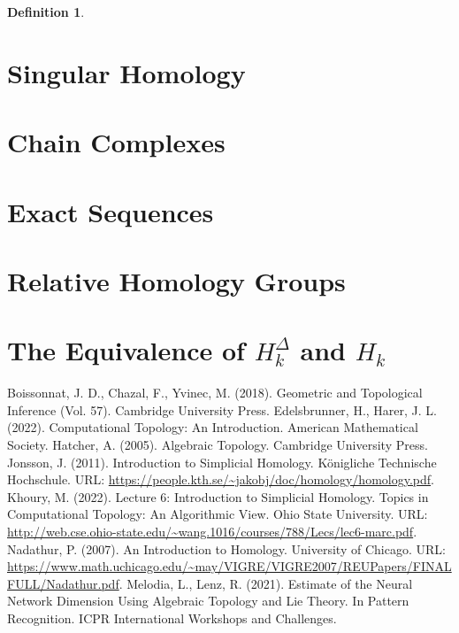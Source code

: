 \documentclass{article}
\newtheorem*{definition}{Definition}
\begin{document}
\begin{definition}

\end{definition}

\section{Singular Homology}
\section{Chain Complexes}
\section{Exact Sequences}
\section{Relative Homology Groups}
\section{The Equivalence of $H_k^\Delta$ and $H_k$}

\begin{thebibliography}{100}
 Boissonnat, J. D., Chazal, F., Yvinec, M. (2018). Geometric and Topological Inference (Vol. 57). Cambridge University Press.
 Edelsbrunner, H., Harer, J. L. (2022). Computational Topology: An Introduction. American Mathematical Society.
 Hatcher, A. (2005). Algebraic Topology. Cambridge University Press.
 Jonsson, J. (2011). Introduction to Simplicial Homology. Königliche Technische Hochschule. URL: \url{https://people.kth.se/~jakobj/doc/homology/homology.pdf}.
 Khoury, M. (2022). Lecture 6: Introduction to Simplicial Homology. Topics in Computational Topology: An Algorithmic View. Ohio State University. URL: \url{http://web.cse.ohio-state.edu/~wang.1016/courses/788/Lecs/lec6-marc.pdf}.
 Nadathur, P. (2007). An Introduction to Homology. University of Chicago. URL: \url{https://www.math.uchicago.edu/~may/VIGRE/VIGRE2007/REUPapers/FINALFULL/Nadathur.pdf}.
 Melodia, L., Lenz, R. (2021). Estimate of the Neural Network Dimension Using Algebraic Topology and Lie Theory. In Pattern Recognition. ICPR International Workshops and Challenges.
\end{thebibliography}
\end{document}
